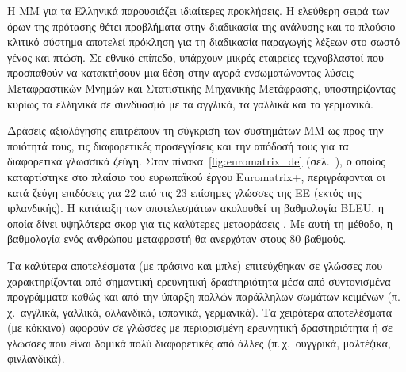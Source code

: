 \begin{multicols}{2}

Η ΜΜ για τα Ελληνικά παρουσιάζει ιδιαίτερες προκλήσεις. Η ελεύθερη σειρά των όρων της πρότασης  θέτει προβλήματα στην διαδικασία της ανάλυσης και το πλούσιο κλιτικό σύστημα αποτελεί πρόκληση για τη διαδικασία παραγωγής λέξεων στο σωστό γένος και πτώση. Σε εθνικό επίπεδο, υπάρχουν μικρές εταιρείες-τεχνοβλαστοί που προσπαθούν να κατακτήσουν μια θέση στην αγορά ενσωματώνοντας λύσεις Μεταφραστικών Μνημών και Στατιστικής Μηχανικής Μετάφρασης, υποστηρίζοντας κυρίως τα ελληνικά σε συνδυασμό με τα αγγλικά, τα γαλλικά και τα γερμανικά.

Δράσεις αξιολόγησης επιτρέπουν τη σύγκριση των συστημάτων MΜ ως προς την ποιότητά τους, τις διαφορετικές προσεγγίσεις και την απόδοσή τους για τα διαφορετικά γλωσσικά ζεύγη. Στον πίνακα~\ref{fig:euromatrix_de} (σελ.~\pageref{fig:euromatrix_de}), ο οποίος καταρτίστηκε στο πλαίσιο του ευρωπαϊκού έργου Euromatrix+, περιγράφονται οι κατά ζεύγη επιδόσεις για 22 από τις 23 επίσημες γλώσσες της ΕΕ (εκτός της ιρλανδικής). Η κατάταξη των αποτελεσμάτων ακολουθεί τη βαθμολογία BLEU, η οποία δίνει υψηλότερα σκορ για τις καλύτερες μεταφράσεις \cite{bleu1}. Με αυτή τη μέθοδο, η βαθμολογία ενός ανθρώπου μεταφραστή θα ανερχόταν στους 80 βαθμούς.

Τα καλύτερα αποτελέσματα (με πράσινο και μπλε) επιτεύχθηκαν σε γλώσσες που χαρακτηρίζονται από σημαντική ερευνητική δραστηριότητα μέσα από συντονισμένα προγράμματα καθώς και από την ύπαρξη πολλών παράλληλων σωμάτων κειμένων (π.\,χ.~αγγλικά, γαλλικά, ολλανδικά, ισπανικά, γερμανικά). Τα χειρότερα αποτελέσματα (με κόκκινο) αφορούν σε γλώσσες με περιορισμένη ερευνητική δραστηριότητα ή σε γλώσσες που είναι δομικά πολύ διαφορετικές από άλλες (π.\,χ.~ουγγρικά, μαλτέζικα, φινλανδικά).


\end{multicols}
